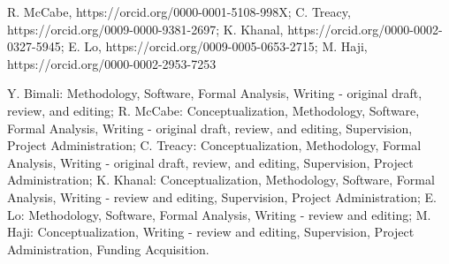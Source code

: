 \documentclass[lineno]{JFM-FLM_Au}
\begin{document}
    \begin{bmhead}{
        R. McCabe, https://orcid.org/0000-0001-5108-998X;
        C. Treacy, https://orcid.org/0009-0000-9381-2697;
        K. Khanal, https://orcid.org/0000-0002-0327-5945;
        E. Lo, https://orcid.org/0009-0005-0653-2715;
        M. Haji, https://orcid.org/0000-0002-2953-7253}
    \end{bmhead}


    \begin{bmhead}{
        Y. Bimali: Methodology, Software, Formal Analysis, Writing - original draft, review, and editing;
        R. McCabe: Conceptualization, Methodology, Software, Formal Analysis, Writing - original draft, review, and editing, Supervision, Project Administration;
        C. Treacy: Conceptualization, Methodology, Formal Analysis, Writing - original draft, review, and editing, Supervision, Project Administration;
        K. Khanal: Conceptualization, Methodology, Software, Formal Analysis, Writing - review and editing, Supervision, Project Administration;
        E. Lo: Methodology, Software, Formal Analysis, Writing - review and editing;
        M. Haji: Conceptualization, Writing - review and editing, Supervision, Project Administration, Funding Acquisition.}
    \end{bmhead}
\fi
%
%
%
\end{document}
